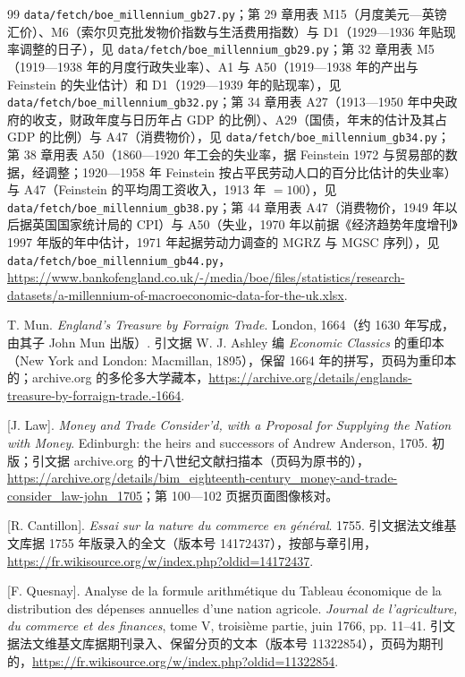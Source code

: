 \begin{thebibliography}{99}
\texttt{data/fetch/boe\_millennium\_gb27.py}；第 29 章用表 M15（月度美元—英镑汇价）、M6（索尔贝克批发物价指数与生活费用指数）与 D1（1929—1936 年贴现率调整的日子），见 \texttt{data/fetch/boe\_millennium\_gb29.py}；第 32 章用表 M5（1919—1938 年的月度行政失业率）、A1 与 A50（1919—1938 年的产出与 Feinstein 的失业估计）和 D1（1929—1939 年的贴现率），见 \texttt{data/fetch/boe\_millennium\_gb32.py}；第 34 章用表 A27（1913—1950 年中央政府的收支，财政年度与日历年占 GDP 的比例）、A29（国债，年末的估计及其占 GDP 的比例）与 A47（消费物价），见 \texttt{data/fetch/boe\_millennium\_gb34.py}；第 38 章用表 A50（1860—1920 年工会的失业率，据 Feinstein 1972 与贸易部的数据，经调整；1920—1958 年 Feinstein 按占平民劳动人口的百分比估计的失业率）与 A47（Feinstein 的平均周工资收入，1913 年 $=100$），见 \texttt{data/fetch/boe\_millennium\_gb38.py}；第 44 章用表 A47（消费物价，1949 年以后据英国国家统计局的 CPI）与 A50（失业，1970 年以前据《经济趋势年度增刊》1997 年版的年中估计，1971 年起据劳动力调查的 MGRZ 与 MGSC 序列），见 \texttt{data/fetch/boe\_millennium\_gb44.py}，\url{https://www.bankofengland.co.uk/-/media/boe/files/statistics/research-datasets/a-millennium-of-macroeconomic-data-for-the-uk.xlsx}.

 T. Mun. \emph{England's Treasure by Forraign Trade}. London, 1664（约 1630 年写成，由其子 John Mun 出版）. 引文据 W. J. Ashley 编 \emph{Economic Classics} 的重印本（New York and London: Macmillan, 1895），保留 1664 年的拼写，页码为重印本的；archive.org 的多伦多大学藏本，\url{https://archive.org/details/englands-treasure-by-forraign-trade.-1664}.

 [J. Law]. \emph{Money and Trade Consider'd, with a Proposal for Supplying the Nation with Money}. Edinburgh: the heirs and successors of Andrew Anderson, 1705. 初版；引文据 archive.org 的十八世纪文献扫描本（页码为原书的），\url{https://archive.org/details/bim_eighteenth-century_money-and-trade-consider_law-john_1705}；第 100—102 页据页面图像核对。

 [R. Cantillon]. \emph{Essai sur la nature du commerce en général}. 1755. 引文据法文维基文库据 1755 年版录入的全文（版本号 14172437），按部与章引用，\url{https://fr.wikisource.org/w/index.php?oldid=14172437}.

 [F. Quesnay]. Analyse de la formule arithmétique du Tableau économique de la distribution des dépenses annuelles d'une nation agricole. \emph{Journal de l'agriculture, du commerce et des finances}, tome V, troisième partie, juin 1766, pp. 11--41. 引文据法文维基文库据期刊录入、保留分页的文本（版本号 11322854），页码为期刊的，\url{https://fr.wikisource.org/w/index.php?oldid=11322854}.


\end{thebibliography}

